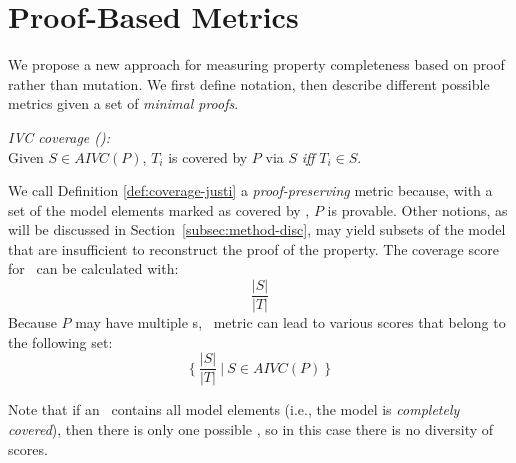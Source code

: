 \newcommand{\minproofcov}{\text{\sc MinProof-Cov}}

\section{Proof-Based Metrics}
\label{sec:method}

We propose a new approach for measuring property completeness based on proof rather than mutation.  We first define notation, then describe different possible metrics given a set of {\em minimal proofs}.%

\begin{definition} {\emph{IVC coverage (\ivccov):}} \\
\label{def:coverage-justi}
Given $S \in AIVC(P)$, $T_i$ is covered by $P$ via $S$ \emph{iff} $T_i \in S$.
\end{definition}

%
We call Definition \ref{def:coverage-justi} a \emph{proof-preserving} metric because, with a set of the model elements marked as covered by \ivccov, $P$ is provable.  Other notions, as will be discussed in Section~\ref{subsec:method-disc}, may yield subsets of the model that are insufficient to reconstruct the proof of the property.
The coverage score for \ivccov\ can be calculated with: $$\frac{|S|}{|T|}$$
Because $P$ may have multiple \mivc s,  \ivccov\ metric can lead to various scores that belong to the following set:
\[
\{~\frac{ |S|}{|T|}~|~S \in AIVC(P)~\}
\]

\noindent Note that if an \mivc ~contains all model elements (i.e., the model is {\em completely covered}), then there is only one possible \mivc , so in this case there is no diversity of scores.


